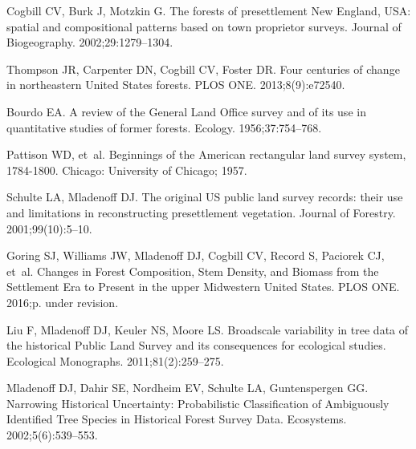 \documentclass[10pt,letterpaper]{article}
\begin{document}
\nolinenumbers

%
%
% 

\begin{thebibliography}{10}

Cogbill CV, Burk J, Motzkin G.
\newblock The forests of presettlement {N}ew {E}ngland, {USA}: spatial and
  compositional patterns based on town proprietor surveys.
\newblock Journal of Biogeography. 2002;29:1279--1304.

Thompson JR, Carpenter DN, Cogbill CV, Foster DR.
\newblock Four centuries of change in northeastern {United States} forests.
\newblock PLOS ONE. 2013;8(9):e72540.

Bourdo EA.
\newblock A review of the {G}eneral {L}and {O}ffice survey and of its use in
  quantitative studies of former forests.
\newblock Ecology. 1956;37:754--768.

Pattison WD, et~al.
\newblock Beginnings of the American rectangular land survey system, 1784-1800.
\newblock Chicago: University of Chicago; 1957.

Schulte LA, Mladenoff DJ.
\newblock The original {US} public land survey records: their use and
  limitations in reconstructing presettlement vegetation.
\newblock Journal of Forestry. 2001;99(10):5--10.

Goring SJ, Williams JW, Mladenoff DJ, Cogbill CV, Record S, Paciorek CJ, et~al.
\newblock Changes in Forest Composition, Stem Density, and Biomass from the
  Settlement Era to Present in the upper {M}idwestern {U}nited {S}tates.
\newblock PLOS ONE. 2016;p. under revision.

Liu F, Mladenoff DJ, Keuler NS, Moore LS.
\newblock Broadscale variability in tree data of the historical Public Land
  Survey and its consequences for ecological studies.
\newblock Ecological Monographs. 2011;81(2):259--275.

Mladenoff DJ, Dahir SE, Nordheim EV, Schulte LA, Guntenspergen GG.
\newblock Narrowing Historical Uncertainty: Probabilistic Classification of
  Ambiguously Identified Tree Species in Historical Forest Survey Data.
\newblock Ecosystems. 2002;5(6):539--553.


\end{thebibliography}
\end{document}
